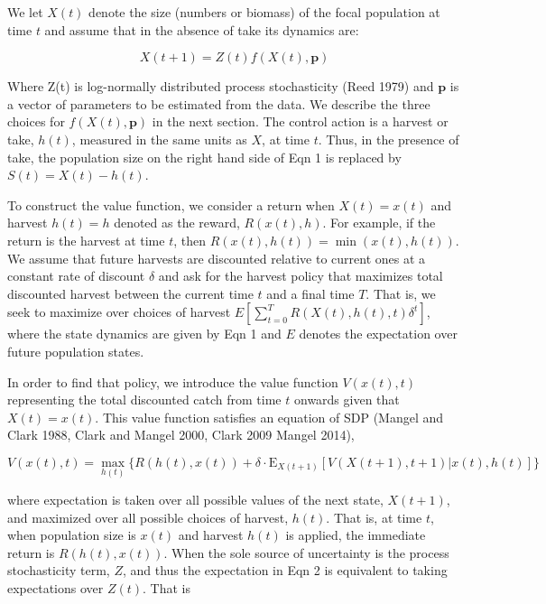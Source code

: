 \documentclass[author-year, 12pt,review]{components/elsarticle} %
\begin{document}
We let $X(t)$ denote the size (numbers or biomass) of the focal
population at time $t$ and assume that in the absence of take its
dynamics are:

\begin{equation}
X(t+1) = Z(t) f(X(t), \mathbf{p}) \label{eq1} 
\end{equation}

Where Z(t) is log-normally distributed process stochasticity (Reed 1979)
and $\mathbf{p}$ is a vector of parameters to be estimated from the
data. We describe the three choices for $f(X(t),\mathbf{p})$ in the next
section. The control action is a harvest or take, $h(t)$, measured in
the same units as $X$, at time $t$. Thus, in the presence of take, the
population size on the right hand side of Eqn 1 is replaced by
$S(t) = X(t) - h(t)$.

To construct the value function, we consider a return when $X(t) = x(t)$
and harvest $h(t) = h$ denoted as the reward, $R(x(t), h)$. For example,
if the return is the harvest at time $t$, then
$R(x(t), h(t)) = \min(x(t), h(t))$. We assume that future harvests are
discounted relative to current ones at a constant rate of discount
$\delta$ and ask for the harvest policy that maximizes total discounted
harvest between the current time $t$ and a final time $T$. That is, we
seek to maximize over choices of harvest
$E [ \sum_{t = 0}^{T}  R(X(t), h(t), t) \delta^t]$, where the state
dynamics are given by Eqn 1 and $E$ denotes the expectation over future
population states.

In order to find that policy, we introduce the value function
$V(x(t), t)$ representing the total discounted catch from time $t$
onwards given that $X(t) = x(t)$. This value function satisfies an
equation of SDP (Mangel and Clark 1988, Clark and Mangel 2000, Clark
2009 Mangel 2014),

\begin{equation}
V(x(t), t) = \max_{h(t)} \lbrace R(h(t), x(t)) + \delta \cdot \mathbf{\mathrm{E}}_{X(t+1)} \left[ V(X(t+1), t+1) | x(t), h(t) \right] \rbrace
\end{equation}

where expectation is taken over all possible values of the next state,
$X(t+1)$, and maximized over all possible choices of harvest, $h(t)$.
That is, at time $t$, when population size is $x(t)$ and harvest $h(t)$
is applied, the immediate return is $R(h(t), x(t))$. When the sole
source of uncertainty is the process stochasticity term, $Z$, and thus
the expectation in Eqn 2 is equivalent to taking expectations over
$Z(t)$. That is
\end{document}
